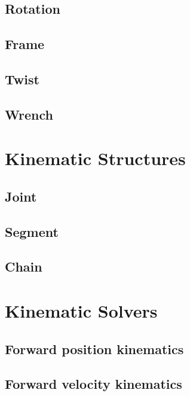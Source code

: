 \documentclass[a4paper,10pt]{report}
\begin{document}
\subsection{Rotation}
\label{sec:rotation}

\subsection{Frame}
\label{sec:frame}

\subsection{Twist}
\label{sec:twist}

\subsection{Wrench}
\label{sec:wrench}


\section{Kinematic Structures}
\label{sec:kinematic-structures}

\subsection{Joint}
\label{sec:joint}

\subsection{Segment}
\label{sec:segment}

\subsection{Chain}
\label{sec:chain}

\section{Kinematic Solvers}
\label{sec:kinematic-solvers}

\subsection{Forward position kinematics}
\label{sec:forw-posit-kinem}

\subsection{Forward velocity kinematics}
\label{sec:forw-veloc-kinem}
\end{document}

